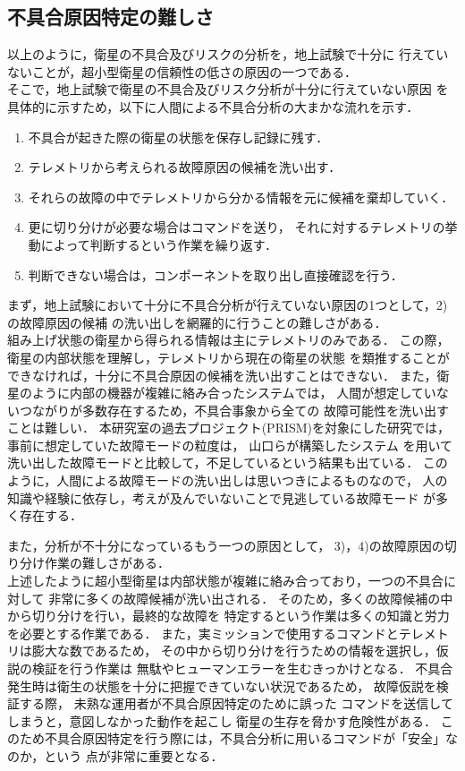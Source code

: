 \documentclass[11pt]{jsreport}
\begin{document}
\subsection{不具合原因特定の難しさ}
以上のように，衛星の不具合及びリスクの分析を，地上試験で十分に
行えていないことが，超小型衛星の信頼性の低さの原因の一つである．\\
そこで，地上試験で衛星の不具合及びリスク分析が十分に行えていない原因
を具体的に示すため，以下に人間による不具合分析の大まかな流れを示す．
\begin{enumerate}[1)]
   \item 不具合が起きた際の衛星の状態を保存し記録に残す． 
   \item テレメトリから考えられる故障原因の候補を洗い出す．
   \item それらの故障の中でテレメトリから分かる情報を元に候補を棄却していく．
   \item 更に切り分けが必要な場合はコマンドを送り，
   それに対するテレメトリの挙動によって判断するという作業を繰り返す．
   \item 判断できない場合は，コンポーネントを取り出し直接確認を行う．
\end{enumerate}
まず，地上試験において十分に不具合分析が行えていない原因の1つとして，2)の故障原因の候補
の洗い出しを網羅的に行うことの難しさがある．\\
組み上げ状態の衛星から得られる情報は主にテレメトリのみである．
この際，衛星の内部状態を理解し，テレメトリから現在の衛星の状態
を類推することができなければ，十分に不具合原因の候補を洗い出すことはできない．
また，衛星のように内部の機器が複雑に絡み合ったシステムでは，
人間が想定していないつながりが多数存在するため，不具合事象から全ての
故障可能性を洗い出すことは難しい．
本研究室の過去プロジェクト(PRISM)を対象にした研究では，
事前に想定していた故障モードの粒度は，%
山口ら\cite{Yamaguchi2014}が構築したシステム
を用いて洗い出した故障モードと比較して，不足しているという結果も出ている．
このように，人間による故障モードの洗い出しは思いつきによるものなので，
人の知識や経験に依存し，考えが及んでいないことで見逃している故障モード
が多く存在する．

また，分析が不十分になっているもう一つの原因として，
3)，4)の故障原因の切り分け作業の難しさがある．\\
上述したように超小型衛星は内部状態が複雑に絡み合っており，一つの不具合に対して
非常に多くの故障候補が洗い出される．
そのため，多くの故障候補の中から切り分けを行い，最終的な故障を
特定するという作業は多くの知識と労力を必要とする作業である．
また，実ミッションで使用するコマンドとテレメトリは膨大な数であるため，
その中から切り分けを行うための情報を選択し，仮説の検証を行う作業は
無駄やヒューマンエラーを生むきっかけとなる．
不具合発生時は衛生の状態を十分に把握できていない状況であるため，
故障仮説を検証する際，
未熟な運用者が不具合原因特定のために誤った%
コマンドを送信してしまうと，意図しなかった動作を起こし
衛星の生存を脅かす危険性がある．
このため不具合原因特定を行う際には，不具合分析に用いるコマンドが「安全」なのか，という
点が非常に重要となる．
\end{document}
